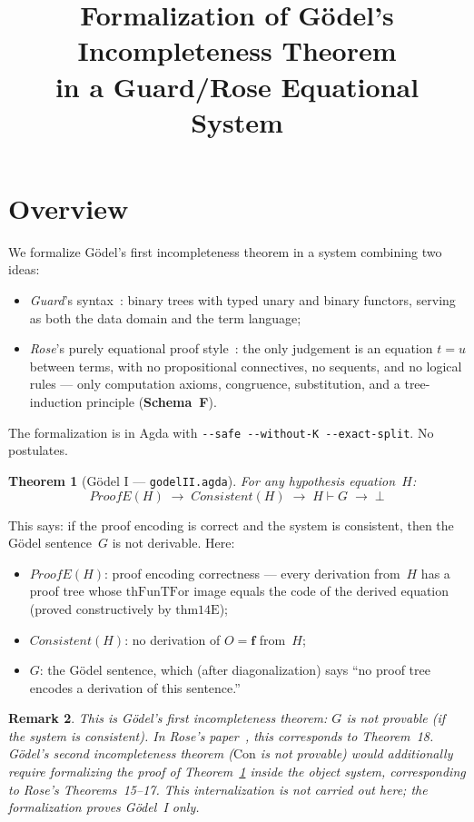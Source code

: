 \documentclass[11pt]{article}
\title{Formalization of G\"odel's Incompleteness Theorem\\
  in a Guard/Rose Equational System}
\author{}
\date{}
\newtheorem{theorem}{Theorem}
\newtheorem{remark}[theorem]{Remark}
\newcommand{\false}{\mathbf{f}}
\newcommand{\SchemaF}{\textbf{Schema~F}}
\begin{document}
\maketitle

\section{Overview}

We formalize G\"odel's first incompleteness theorem in a system
combining two ideas:
\begin{itemize}
\item \emph{Guard}'s syntax~\cite{guard1963}: binary trees with
  typed unary and binary functors, serving as both the data domain
  and the term language;
\item \emph{Rose}'s purely equational proof style~\cite{rose1961}:
  the only judgement is an equation $t = u$ between terms, with no
  propositional connectives, no sequents, and no logical rules ---
  only computation axioms, congruence, substitution, and a
  tree-induction principle (\SchemaF).
\end{itemize}
The formalization is in Agda with
\texttt{-{}-safe -{}-without-K -{}-exact-split}.  No postulates.

\begin{theorem}[G\"odel I --- \texttt{godelII.agda}]
\label{thm:godel1}
For any hypothesis equation~$H$:
\[
  \mathit{ProofE}(H) \;\to\; \mathit{Consistent}(H) \;\to\;
  H \vdash G \;\to\; \bot
\]
\end{theorem}

\noindent
This says: if the proof encoding is correct and the system is
consistent, then the G\"odel sentence~$G$ is not derivable.
Here:
\begin{itemize}
\item $\mathit{ProofE}(H)$: proof encoding correctness --- every
  derivation from~$H$ has a proof tree whose $\mathrm{thFunTFor}$
  image equals the code of the derived equation
  (proved constructively by $\mathrm{thm14E}$);
\item $\mathit{Consistent}(H)$: no derivation of
  $O = \false$ from~$H$;
\item $G$: the G\"odel sentence, which (after diagonalization) says
  ``no proof tree encodes a derivation of this sentence.''
\end{itemize}

\begin{remark}
This is G\"odel's \emph{first} incompleteness theorem:
$G$ is not provable (if the system is consistent).
In Rose's paper~\cite{rose1961}, this corresponds to Theorem~18.
G\"odel's \emph{second} incompleteness theorem ($\mathrm{Con}$ is
not provable) would additionally require formalizing the proof of
Theorem~\ref{thm:godel1} \emph{inside} the object system,
corresponding to Rose's Theorems~15--17.
This internalization is not carried out here;
the formalization proves G\"odel~I only.
\end{remark}
\end{document}
